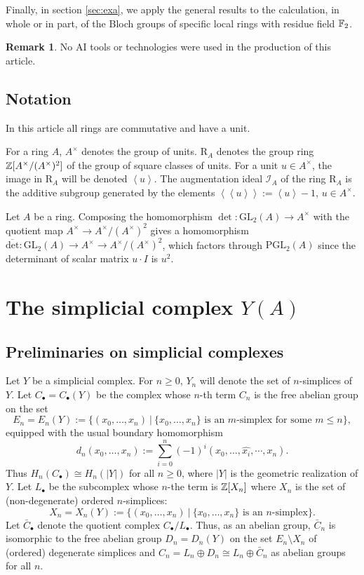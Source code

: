 \documentclass[12pt]{amsart}
\theoremstyle{definition}
\newtheorem{rem}[lem]{Remark}
\newcommand{\F}[1]{\Bbb{F}_{#1}}
\newcommand{\Z}{\Bbb{Z}}
\newcommand{\gl}[2]{\mathrm{GL}_{#1}(#2)}
\newcommand{\pgl}[2]{\mathrm{PGL}_{#1}(#2)}
\newcommand{\<}{\langle}
\renewcommand{\>}{\rangle}
\newcommand{\sgr}[1]{\mathrm{R}_{#1}}%
\newcommand{\an}[1]{\left\langle{#1}\right\rangle}
\newcommand{\pf}[1]{\left\langle\!\left\langle{#1}\right\rangle\!\right\rangle}
\newcommand{\aug}[1]{\mathcal{I}_{#1}}
\newcommand{\odet}{\overline{\mathrm{det}}}
\begin{document}
Finally, in section \ref{sec:exa}, we apply the general results to the calculation, in whole or in part, of the Bloch groups of  specific local rings with residue field $\F{2}$.

\begin{rem}
No AI tools or technologies were used in the production of this article.
\end{rem}
\subsection{Notation}  In this article all  rings are commutative and have a unit.

For a ring $A$, $A^\times$ denotes the group of units. $\sgr{A}$ denotes the group ring
$\Z[A^\times/(A^\times)^2]$ of the group of square classes of units. For a unit $u\in A^\times$, the image in $\sgr{A}$ will be denoted $\an{u}$. The augmentation ideal $\aug{A}$ of the ring $\sgr{A}$ is the additive subgroup generated by the elements $\pf{u}:=\an{u}-1$, $u\in A^\times$.  

 Let $A$ be a ring. Composing the homomorphism $\det:\gl{2}{A}\to A^\times$ with the quotient map $A^\times\to A^\times/(A^\times)^2$ gives a homomorphism
$\odet:\gl{2}{A}\to A^\times\to A^\times/(A^\times)^2$, which factors through $\pgl{2}{A}$ since the determinant of scalar matrix $u\cdot I$ is $u^2$.

\section{The simplicial complex $Y(A)$}\label{sec:ya}
\subsection{Preliminaries on simplicial complexes}
Let $Y$ be a simplicial complex.  For $n\geq 0$, $Y_n$ will denote the set of $n$-simplices of $Y$. Let $C_\bullet=C_\bullet(Y)$  be the complex whose $n$-th term $C_n$ is the free abelian group on the set 
\[
E_n=E_n(Y):=\{ (x_0,\ldots,x_n)\ |\ \{ x_0,\ldots,x_n\} \mbox{ is an $m$-simplex  for some }m\leq n\},
\] 
equipped with the usual boundary homomorphism 
\[
d_n (x_0,\ldots,x_n):= \sum_{i=0}^n(-1)^i(x_0,\ldots, \widehat{x_i},\cdots,x_n).
\]
Thus $H_n(C_\bullet)\cong H_n(|Y|)$ for all $n\geq 0$, where $|Y|$ is the geometric realization of $Y$.
Let $L_\bullet$ be the subcomplex whose $n$-the term is $\Z[X_n]$ where $X_n$ is the set of (non-degenerate) ordered $n$-simplices:
\[
X_n=X_n(Y):=\{ (x_0,\ldots,x_n)\ |\ \{ x_0,\ldots,x_n\} \mbox{ is an $n$-simplex}\}.
\]
Let $\bar{C}_\bullet$ denote the quotient complex $C_\bullet/L_\bullet$. Thus, as an abelian group, $\bar{C}_n$ is isomorphic to  the free abelian group $D_n=D_n(Y)$ on the  set 
$E_n\setminus X_n$ of (ordered) degenerate simplices and $C_n=L_n\oplus D_n \cong L_n\oplus \bar{C}_n$ as abelian groups for all $n$.
\end{document}
